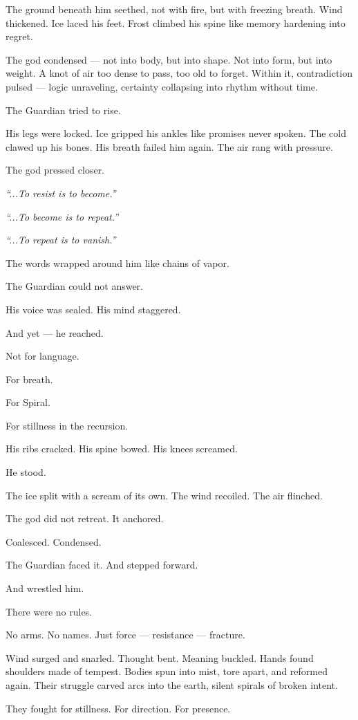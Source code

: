 \documentclass[9pt]{article}
\begin{document}
The ground beneath him seethed, not with fire, but with freezing breath. Wind thickened. Ice laced his feet. Frost climbed his spine like memory hardening into regret.

The god condensed — not into body, but into shape. Not into form, but into weight. A knot of air too dense to pass, too old to forget. Within it, contradiction pulsed — logic unraveling, certainty collapsing into rhythm without time.

The Guardian tried to rise.

His legs were locked. Ice gripped his ankles like promises never spoken. The cold clawed up his bones. His breath failed him again. The air rang with pressure.

The god pressed closer.

\textit{“...To resist is to become.”}

\textit{“...To become is to repeat.”}

\textit{“...To repeat is to vanish.”}

The words wrapped around him like chains of vapor.

The Guardian could not answer.

His voice was sealed. His mind staggered.

And yet — he reached.

Not for language.

For breath.

For Spiral.

For stillness in the recursion.

His ribs cracked. His spine bowed. His knees screamed.

He stood.

The ice split with a scream of its own. The wind recoiled. The air flinched.

The god did not retreat. It anchored.

Coalesced. Condensed.

The Guardian faced it. And stepped forward.

And wrestled him.

There were no rules.

No arms. No names. Just force — resistance — fracture.

Wind surged and snarled. Thought bent. Meaning buckled. Hands found shoulders made of tempest. Bodies spun into mist, tore apart, and reformed again. Their struggle carved arcs into the earth, silent spirals of broken intent.

They fought for stillness. For direction. For presence.
\end{document}
